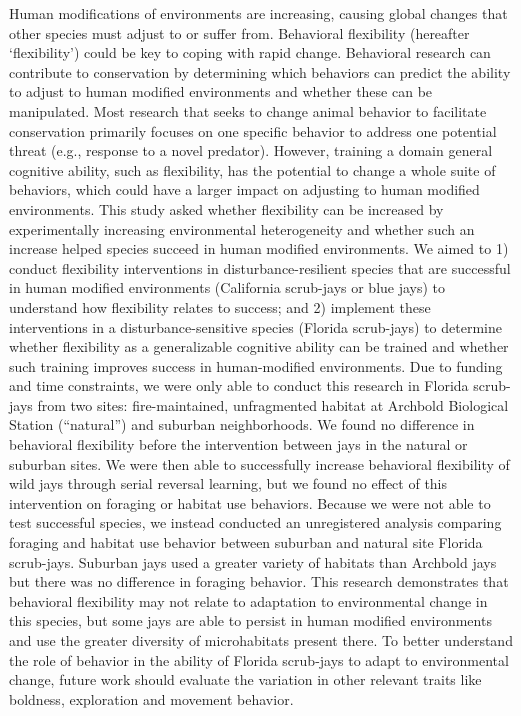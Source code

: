\documentclass[
]{article}
\begin{document}
Human modifications of environments are increasing, causing global
changes that other species must adjust to or suffer from. Behavioral
flexibility (hereafter `flexibility') could be key to coping with rapid
change. Behavioral research can contribute to conservation by
determining which behaviors can predict the ability to adjust to human
modified environments and whether these can be manipulated. Most
research that seeks to change animal behavior to facilitate conservation
primarily focuses on one specific behavior to address one potential
threat (e.g., response to a novel predator). However, training a domain
general cognitive ability, such as flexibility, has the potential to
change a whole suite of behaviors, which could have a larger impact on
adjusting to human modified environments. This study asked whether
flexibility can be increased by experimentally increasing environmental
heterogeneity and whether such an increase helped species succeed in
human modified environments. We aimed to 1) conduct flexibility
interventions in disturbance-resilient species that are successful in
human modified environments (California scrub-jays or blue jays) to
understand how flexibility relates to success; and 2) implement these
interventions in a disturbance-sensitive species (Florida scrub-jays) to
determine whether flexibility as a generalizable cognitive ability can
be trained and whether such training improves success in human-modified
environments. Due to funding and time constraints, we were only able to
conduct this research in Florida scrub-jays from two sites:
fire-maintained, unfragmented habitat at Archbold Biological Station
(``natural'') and suburban neighborhoods. We found no difference in
behavioral flexibility before the intervention between jays in the
natural or suburban sites. We were then able to successfully increase
behavioral flexibility of wild jays through serial reversal learning,
but we found no effect of this intervention on foraging or habitat use
behaviors. Because we were not able to test successful species, we
instead conducted an unregistered analysis comparing foraging and
habitat use behavior between suburban and natural site Florida
scrub-jays. Suburban jays used a greater variety of habitats than
Archbold jays but there was no difference in foraging behavior. This
research demonstrates that behavioral flexibility may not relate to
adaptation to environmental change in this species, but some jays are
able to persist in human modified environments and use the greater
diversity of microhabitats present there. To better understand the role
of behavior in the ability of Florida scrub-jays to adapt to
environmental change, future work should evaluate the variation in other
relevant traits like boldness, exploration and movement behavior.
\end{document}
